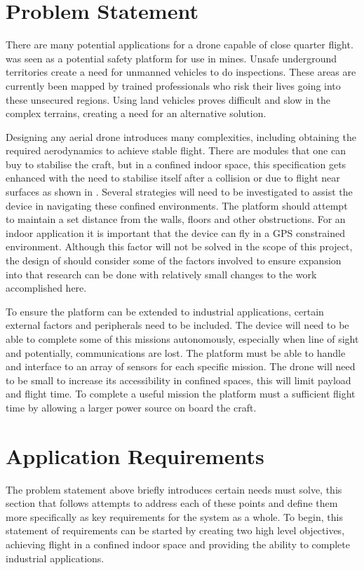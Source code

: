 	\section{Problem Statement}
	There are many potential applications for a drone capable of close quarter flight. \projectName was seen as a potential safety platform for use in mines. Unsafe underground territories create a need for unmanned vehicles to do inspections. These areas are currently been mapped by trained professionals who risk their lives going into these unsecured regions. Using land vehicles proves difficult and slow in the complex terrains, creating a need for an alternative solution.
	
	Designing any aerial drone introduces many complexities, including obtaining the required aerodynamics to achieve stable flight. There are modules that one can buy to stabilise the craft, but in a confined indoor space, this specification gets enhanced with the need to stabilise itself after a collision or due to flight near surfaces as shown in \cite{NearWall, Klaptocz2010}. 
	Several strategies will need to be investigated to assist the device in navigating these confined environments. The platform should attempt to maintain a set distance from the walls, floors and other obstructions.
	For an indoor application it is important that the device can fly in a GPS constrained environment. Although this factor will not be solved in the scope of this project, the design of \projectName should consider some of the factors involved to ensure expansion into that research can be done with relatively small changes to the work accomplished here.
	
	To ensure the platform can be extended to industrial applications, certain external factors and peripherals need to be included. The device will need to be able to complete some of this missions autonomously, especially when line of sight and potentially, communications are lost.
	The platform must be able to handle and interface to an array of sensors for each specific mission. The drone will need to be small to increase its accessibility in confined spaces, this will limit payload and flight time. To complete a useful mission the platform must a sufficient flight time by allowing a larger power source on board the craft.
	
	\section{Application Requirements}
	The problem statement above briefly introduces certain needs \projectName must solve, this section that follows attempts to address each of these points and define them more specifically as key requirements for the system as a whole. To begin, this statement of requirements can be started by creating two high level objectives, achieving flight in a confined indoor space and providing the ability to complete industrial applications. 
	
